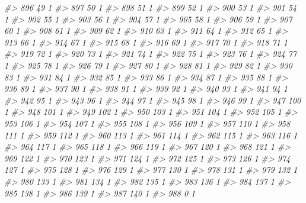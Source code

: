 \documentclass[]{article}
\newenvironment{Shaded}{\begin{snugshade}}{\end{snugshade}}
\newcommand{\CommentTok}[1]{\textcolor[rgb]{0.56,0.35,0.01}{\textit{#1}}}
\begin{document}
\begin{Shaded}
\begin{Highlighting}[]
\CommentTok{#> 896   49  1}
\CommentTok{#> 897   50  1}
\CommentTok{#> 898   51  1}
\CommentTok{#> 899   52  1}
\CommentTok{#> 900   53  1}
\CommentTok{#> 901   54  1}
\CommentTok{#> 902   55  1}
\CommentTok{#> 903   56  1}
\CommentTok{#> 904   57  1}
\CommentTok{#> 905   58  1}
\CommentTok{#> 906   59  1}
\CommentTok{#> 907   60  1}
\CommentTok{#> 908   61  1}
\CommentTok{#> 909   62  1}
\CommentTok{#> 910   63  1}
\CommentTok{#> 911   64  1}
\CommentTok{#> 912   65  1}
\CommentTok{#> 913   66  1}
\CommentTok{#> 914   67  1}
\CommentTok{#> 915   68  1}
\CommentTok{#> 916   69  1}
\CommentTok{#> 917   70  1}
\CommentTok{#> 918   71  1}
\CommentTok{#> 919   72  1}
\CommentTok{#> 920   73  1}
\CommentTok{#> 921   74  1}
\CommentTok{#> 922   75  1}
\CommentTok{#> 923   76  1}
\CommentTok{#> 924   77  1}
\CommentTok{#> 925   78  1}
\CommentTok{#> 926   79  1}
\CommentTok{#> 927   80  1}
\CommentTok{#> 928   81  1}
\CommentTok{#> 929   82  1}
\CommentTok{#> 930   83  1}
\CommentTok{#> 931   84  1}
\CommentTok{#> 932   85  1}
\CommentTok{#> 933   86  1}
\CommentTok{#> 934   87  1}
\CommentTok{#> 935   88  1}
\CommentTok{#> 936   89  1}
\CommentTok{#> 937   90  1}
\CommentTok{#> 938   91  1}
\CommentTok{#> 939   92  1}
\CommentTok{#> 940   93  1}
\CommentTok{#> 941   94  1}
\CommentTok{#> 942   95  1}
\CommentTok{#> 943   96  1}
\CommentTok{#> 944   97  1}
\CommentTok{#> 945   98  1}
\CommentTok{#> 946   99  1}
\CommentTok{#> 947  100  1}
\CommentTok{#> 948  101  1}
\CommentTok{#> 949  102  1}
\CommentTok{#> 950  103  1}
\CommentTok{#> 951  104  1}
\CommentTok{#> 952  105  1}
\CommentTok{#> 953  106  1}
\CommentTok{#> 954  107  1}
\CommentTok{#> 955  108  1}
\CommentTok{#> 956  109  1}
\CommentTok{#> 957  110  1}
\CommentTok{#> 958  111  1}
\CommentTok{#> 959  112  1}
\CommentTok{#> 960  113  1}
\CommentTok{#> 961  114  1}
\CommentTok{#> 962  115  1}
\CommentTok{#> 963  116  1}
\CommentTok{#> 964  117  1}
\CommentTok{#> 965  118  1}
\CommentTok{#> 966  119  1}
\CommentTok{#> 967  120  1}
\CommentTok{#> 968  121  1}
\CommentTok{#> 969  122  1}
\CommentTok{#> 970  123  1}
\CommentTok{#> 971  124  1}
\CommentTok{#> 972  125  1}
\CommentTok{#> 973  126  1}
\CommentTok{#> 974  127  1}
\CommentTok{#> 975  128  1}
\CommentTok{#> 976  129  1}
\CommentTok{#> 977  130  1}
\CommentTok{#> 978  131  1}
\CommentTok{#> 979  132  1}
\CommentTok{#> 980  133  1}
\CommentTok{#> 981  134  1}
\CommentTok{#> 982  135  1}
\CommentTok{#> 983  136  1}
\CommentTok{#> 984  137  1}
\CommentTok{#> 985  138  1}
\CommentTok{#> 986  139  1}
\CommentTok{#> 987  140  1}
\CommentTok{#> 988    0  1}

\end{Highlighting}
\end{Shaded}
\end{document}
